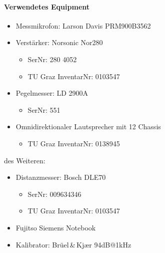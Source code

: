 \documentclass[11pt]{report}
\begin{document}
\paragraph{Verwendetes Equipment}
\begin{itemize}
\item Messmikrofon: Larson Davis PRM900B3562
\item Verst\"arker: Norsonic Nor280
\begin{itemize}
\item SerNr: 280 4052
\item TU Graz InventarNr: 0103547
\end{itemize}
\item Pegelmesser: LD 2900A
\begin{itemize}
\item SerNr: 551
\end{itemize}
\item Omnidirektionaler Lautsprecher mit 12 Chassis
\begin{itemize}
\item TU Graz InventarNr: 0138945
\end{itemize}
\end{itemize}
des Weiteren:
\begin{itemize}
\item Distanzmesser: Bosch DLE70
\begin{itemize}
\item SerNr: 009634346
\item TU Graz InventarNr: 0103547
\end{itemize}
\item Fujitso Siemens Notebook
\item Kalibrator: Br\"uel\,\&\,Kj\ae r 94dB@1kHz
\end{itemize}
\end{document}

